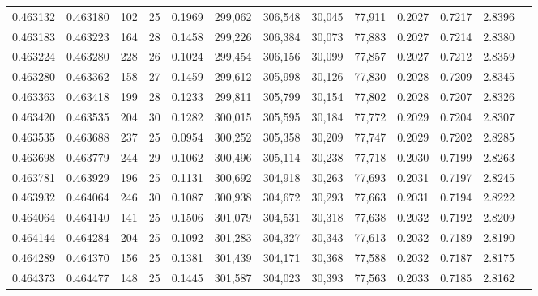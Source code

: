 \begin{tabular}{rrrrrrrrrrrrr}
0.463132 & 0.463180 & 102 &  25 &                                     0.1969 & 299,062 & 306,548 &  30,045 &  77,911 & 0.2027 & 0.7217 & 2.8396 \\
0.463183 & 0.463223 & 164 &  28 &                                     0.1458 & 299,226 & 306,384 &  30,073 &  77,883 & 0.2027 & 0.7214 & 2.8380 \\
0.463224 & 0.463280 & 228 &  26 &                                     0.1024 & 299,454 & 306,156 &  30,099 &  77,857 & 0.2027 & 0.7212 & 2.8359 \\
0.463280 & 0.463362 & 158 &  27 &                                     0.1459 & 299,612 & 305,998 &  30,126 &  77,830 & 0.2028 & 0.7209 & 2.8345 \\
0.463363 & 0.463418 & 199 &  28 &                                     0.1233 & 299,811 & 305,799 &  30,154 &  77,802 & 0.2028 & 0.7207 & 2.8326 \\
0.463420 & 0.463535 & 204 &  30 &                                     0.1282 & 300,015 & 305,595 &  30,184 &  77,772 & 0.2029 & 0.7204 & 2.8307 \\
0.463535 & 0.463688 & 237 &  25 &                                     0.0954 & 300,252 & 305,358 &  30,209 &  77,747 & 0.2029 & 0.7202 & 2.8285 \\
0.463698 & 0.463779 & 244 &  29 &                                     0.1062 & 300,496 & 305,114 &  30,238 &  77,718 & 0.2030 & 0.7199 & 2.8263 \\
0.463781 & 0.463929 & 196 &  25 &                                     0.1131 & 300,692 & 304,918 &  30,263 &  77,693 & 0.2031 & 0.7197 & 2.8245 \\
0.463932 & 0.464064 & 246 &  30 &                                     0.1087 & 300,938 & 304,672 &  30,293 &  77,663 & 0.2031 & 0.7194 & 2.8222 \\
0.464064 & 0.464140 & 141 &  25 &                                     0.1506 & 301,079 & 304,531 &  30,318 &  77,638 & 0.2032 & 0.7192 & 2.8209 \\
0.464144 & 0.464284 & 204 &  25 &                                     0.1092 & 301,283 & 304,327 &  30,343 &  77,613 & 0.2032 & 0.7189 & 2.8190 \\
0.464289 & 0.464370 & 156 &  25 &                                     0.1381 & 301,439 & 304,171 &  30,368 &  77,588 & 0.2032 & 0.7187 & 2.8175 \\
0.464373 & 0.464477 & 148 &  25 &                                     0.1445 & 301,587 & 304,023 &  30,393 &  77,563 & 0.2033 & 0.7185 & 2.8162 \\

\end{tabular}
